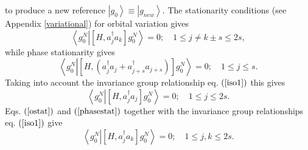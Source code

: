 \documentclass[titlepage]{article}%
\begin{document}
to produce a new reference $\left\vert g_{0}\right\rangle \equiv\left\vert
g_{new}\right\rangle .$ The stationarity conditions (see Appendix
\ref{variational}) for orbital variation gives
\begin{equation}
\left\langle g_{0}^{N}\left\vert \left[  H,a_{j}^{\dagger}a_{k}\right]
g_{0}^{N}\right.  \right\rangle =0;\quad1\leq j\neq k\pm s\leq2s,
\label{ostat}%
\end{equation}
while phase stationarity gives%
\begin{equation}
\left\langle g_{0}^{N}\left\vert \left[  H,\left(  a_{j}^{\dagger}%
a_{j}+a_{j+s}^{\dagger}a_{j+s}\right)  \right]  g_{0}^{N}\right.
\right\rangle =0;\quad1\leq j\leq s.
\end{equation}
Taking into account the invariance group relationship eq. $\left(
\ref{iso1}\right)  $ this gives
\begin{equation}
\left\langle g_{0}^{N}\left\vert \left[  H,a_{j}^{\dagger}a_{j}\right]
g_{0}^{N}\right.  \right\rangle =0;\quad1\leq j\leq2s. \label{phasestat}%
\end{equation}
Eqs. $\left(  \ref{ostat}\right)  $ and $\left(  \ref{phasestat}\right)  $
together with the invariance group relationships eq. $\left(  \ref{iso1}%
\right)  $ give
\begin{equation}
\left\langle g_{0}^{N}\left\vert \left[  H,a_{j}^{\dagger}a_{k}\right]
g_{0}^{N}\right.  \right\rangle =0;\quad1\leq j,k\leq2s. \label{orbstat}%
\end{equation}
\end{document}
